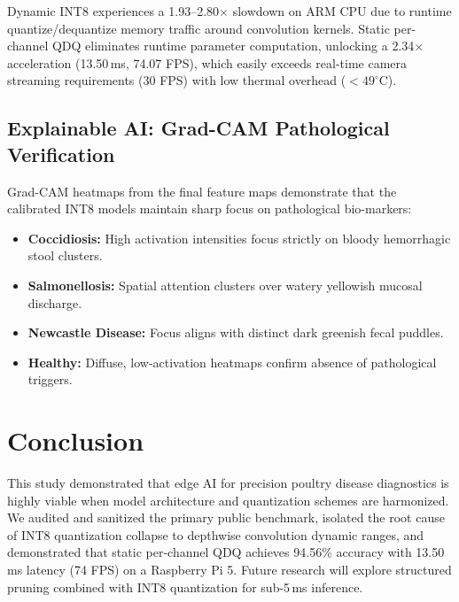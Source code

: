 \documentclass[11pt,a4paper]{article}
\begin{document}
Dynamic INT8 experiences a 1.93--2.80$\times$ slowdown on ARM CPU due to runtime quantize/dequantize memory traffic around convolution kernels. Static per-channel QDQ eliminates runtime parameter computation, unlocking a 2.34$\times$ acceleration (13.50\,ms, 74.07 FPS), which easily exceeds real-time camera streaming requirements (30 FPS) with low thermal overhead ($< 49^\circ$C).

\subsection{Explainable AI: Grad-CAM Pathological Verification}
Grad-CAM heatmaps from the final feature maps demonstrate that the calibrated INT8 models maintain sharp focus on pathological bio-markers:
\begin{itemize}
    \item \textbf{Coccidiosis:} High activation intensities focus strictly on bloody hemorrhagic stool clusters.
    \item \textbf{Salmonellosis:} Spatial attention clusters over watery yellowish mucosal discharge.
    \item \textbf{Newcastle Disease:} Focus aligns with distinct dark greenish fecal puddles.
    \item \textbf{Healthy:} Diffuse, low-activation heatmaps confirm absence of pathological triggers.
\end{itemize}

\section{Conclusion}
This study demonstrated that edge AI for precision poultry disease diagnostics is highly viable when model architecture and quantization schemes are harmonized. We audited and sanitized the primary public benchmark, isolated the root cause of INT8 quantization collapse to depthwise convolution dynamic ranges, and demonstrated that static per-channel QDQ achieves 94.56\% accuracy with 13.50\,ms latency (74 FPS) on a Raspberry Pi 5. Future research will explore structured pruning combined with INT8 quantization for sub-5\,ms inference.
\end{document}
